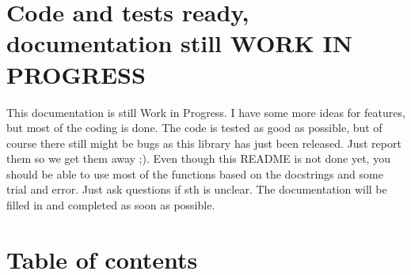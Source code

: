 \documentclass[a4paper,10pt,english]{sphinxmanual}
\begin{document}
\section{Code and tests ready, documentation still WORK IN PROGRESS}
\label{\detokenize{README:code-and-tests-ready-documentation-still-work-in-progress}}
\sphinxAtStartPar
This documentation is still Work in Progress. I have some more ideas for features, but most of the coding is done. The code is tested as good as possible, but of course there still might be bugs as this library has just been released. Just report them so we get them away ;). Even though this README is not done yet, you should be able to use most of the functions based on the docstrings and some trial and error. Just ask questions  if sth is unclear. The documentation will be filled in and completed as soon as possible.

\sphinxAtStartPar
{}


\section{Table of contents}
\label{\detokenize{README:table-of-contents}}
\end{document}
